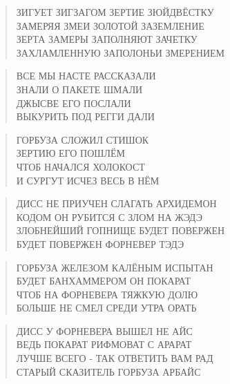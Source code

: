 \poemtitle{***}
\begin{verse}
ЗИГУЕТ ЗИГЗАГОМ ЗЕРТИЕ ЗЮЙДВЁСТКУ\\
ЗАМЕРЯЯ ЗМЕИ ЗОЛОТОЙ ЗАЗЕМЛЕНИЕ\\
ЗЕРТА ЗАМЕРЫ ЗАПОЛНЯЮТ ЗАЧЕТКУ\\
ЗАХЛАМЛЕННУЮ ЗАПОЛОНЬИ ЗМЕРЕНИЕМ
\end{verse}

\poemtitle{***}
\begin{verse}
ВСЕ МЫ НАСТЕ РАССКАЗАЛИ\\
ЗНАЛИ О ПАКЕТЕ ШМАЛИ\\
ДЖЫСВЕ ЕГО ПОСЛАЛИ\\
ВЫКУРИТЬ ПОД РЕГГИ ДАЛИ
\end{verse}

\poemtitle{***}
\begin{verse}
ГОРБУЗА СЛОЖИЛ СТИШОК\\
ЗЕРТИЮ ЕГО ПОШЛЁМ\\
ЧТОБ НАЧАЛСЯ ХОЛОКОСТ\\
И СУРГУТ ИСЧЕЗ ВЕСЬ В НЁМ
\end{verse}

\poemtitle{***}
\begin{verse}
ДИСС НЕ ПРИУЧЕН СЛАГАТЬ АРХИДЕМОН\\
КОДОМ ОН РУБИТСЯ С ЗЛОМ НА ЖЭДЭ\\
ЗЛОБНЕЙШИЙ ГОПНИЩЕ БУДЕТ ПОВЕРЖЕН\\
БУДЕТ ПОВЕРЖЕН ФОРНЕВЕР ТЭДЭ
\end{verse}

\poemtitle{***}
\begin{verse}
ГОРБУЗА ЖЕЛЕЗОМ КАЛЁНЫМ ИСПЫТАН\\
БУДЕТ БАНХАММЕРОМ ОН ПОКАРАТ\\
ЧТОБ НА ФОРНЕВЕРА ТЯЖКУЮ ДОЛЮ\\
БОЛЬШЕ НЕ СМЕЛ СРЕДИ УТРА ОРАТЬ
\end{verse}

\poemtitle{***}
\begin{verse}
ДИСС У ФОРНЕВЕРА ВЫШЕЛ НЕ АЙС\\
ВЕДЬ ПОКАРАТ РИФМОВАТ С АРАРАТ\\
ЛУЧШЕ ВСЕГО - ТАК ОТВЕТИТЬ ВАМ РАД\\
СТАРЫЙ СКАЗИТЕЛЬ ГОРБУЗА АРБАЙС
\end{verse}

